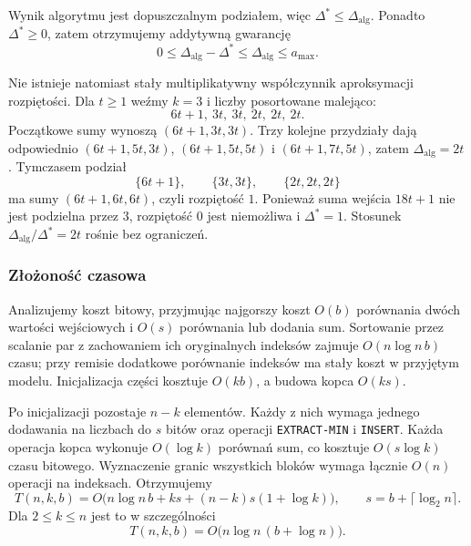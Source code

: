 \documentclass[11pt]{article}
\begin{document}
Wynik algorytmu jest dopuszczalnym podziałem, więc
$\Delta^*\leq\Delta_{\mathrm{alg}}$.
Ponadto $\Delta^*\geq0$, zatem otrzymujemy addytywną gwarancję
\begin{equation}
  0\leq\Delta_{\mathrm{alg}}-\Delta^*
  \leq\Delta_{\mathrm{alg}}
  \leq a_{\max}.
\end{equation}

Nie istnieje natomiast stały multiplikatywny współczynnik aproksymacji
rozpiętości. Dla $t\geq1$ weźmy $k=3$ i liczby posortowane malejąco:
\begin{equation}
  6t+1,\ 3t,\ 3t,\ 2t,\ 2t,\ 2t.
\end{equation}
Początkowe sumy wynoszą $(6t+1,3t,3t)$. Trzy kolejne przydziały
dają odpowiednio $(6t+1,5t,3t)$, $(6t+1,5t,5t)$ i
$(6t+1,7t,5t)$, zatem $\Delta_{\mathrm{alg}}=2t$.
Tymczasem podział
\begin{equation}
  \{6t+1\},\qquad \{3t,3t\},\qquad \{2t,2t,2t\}
\end{equation}
ma sumy $(6t+1,6t,6t)$, czyli rozpiętość $1$.
Ponieważ suma wejścia $18t+1$ nie jest podzielna przez $3$,
rozpiętość $0$ jest niemożliwa i $\Delta^*=1$.
Stosunek $\Delta_{\mathrm{alg}}/\Delta^*=2t$ rośnie bez ograniczeń.

\subsubsection{Złożoność czasowa}

Analizujemy koszt bitowy, przyjmując najgorszy koszt $O(b)$
porównania dwóch wartości wejściowych i $O(s)$ porównania lub dodania
sum. Sortowanie przez scalanie par z zachowaniem ich oryginalnych
indeksów zajmuje $O(n\log n\,b)$ czasu; przy remisie dodatkowe
porównanie indeksów ma stały koszt w przyjętym modelu.
Inicjalizacja części kosztuje $O(kb)$, a budowa kopca $O(ks)$.

Po inicjalizacji pozostaje $n-k$ elementów. Każdy z nich wymaga
jednego dodawania na liczbach do $s$ bitów oraz operacji
\texttt{EXTRACT-MIN} i \texttt{INSERT}. Każda operacja kopca wykonuje
$O(\log k)$ porównań sum, co kosztuje $O(s\log k)$ czasu bitowego.
Wyznaczenie granic wszystkich bloków wymaga łącznie $O(n)$
operacji na indeksach. Otrzymujemy
\begin{equation}
  T(n,k,b)=O\bigl(n\log n\,b+ks+(n-k)s(1+\log k)\bigr),
  \qquad s=b+\lceil\log_2 n\rceil.
\end{equation}
Dla $2\leq k\leq n$ jest to w szczególności
\begin{equation}
  \boxed{T(n,k,b)=O\bigl(n\log n\,(b+\log n)\bigr).}
\end{equation}
\end{document}
